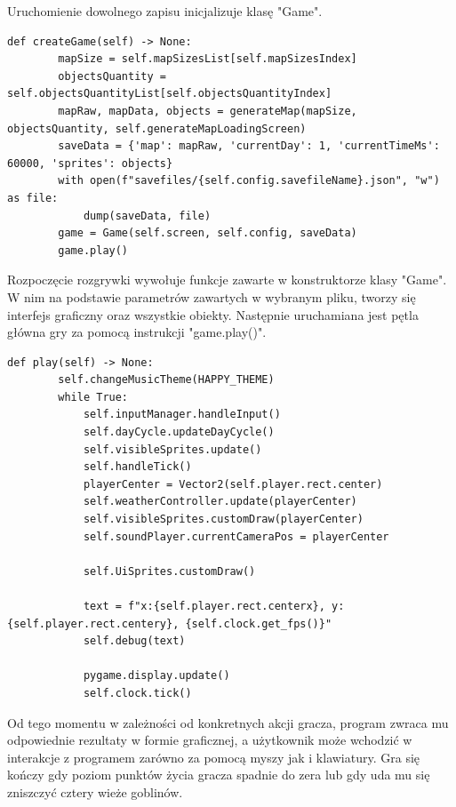 \documentclass{article}
\begin{document}
Uruchomienie dowolnego zapisu inicjalizuje klasę "Game".

\begin{center}
    \begin{lstlisting}[language=pythonSchema]
    def createGame(self) -> None:
        mapSize = self.mapSizesList[self.mapSizesIndex]
        objectsQuantity = self.objectsQuantityList[self.objectsQuantityIndex]
        mapRaw, mapData, objects = generateMap(mapSize, objectsQuantity, self.generateMapLoadingScreen)
        saveData = {'map': mapRaw, 'currentDay': 1, 'currentTimeMs': 60000, 'sprites': objects}
        with open(f"savefiles/{self.config.savefileName}.json", "w") as file:
            dump(saveData, file)
        game = Game(self.screen, self.config, saveData)
        game.play()
    \end{lstlisting}
\end{center}

Rozpoczęcie rozgrywki wywołuje funkcje zawarte w konstruktorze klasy "Game". W nim na podstawie parametrów zawartych w wybranym pliku, tworzy się interfejs graficzny oraz wszystkie obiekty. Następnie uruchamiana jest pętla główna gry za pomocą instrukcji "game.play()".

\newpage

\begin{center}
    \begin{lstlisting}[language=pythonSchema]
    def play(self) -> None:
        self.changeMusicTheme(HAPPY_THEME)
        while True:
            self.inputManager.handleInput()
            self.dayCycle.updateDayCycle()
            self.visibleSprites.update()
            self.handleTick()
            playerCenter = Vector2(self.player.rect.center)
            self.weatherController.update(playerCenter)
            self.visibleSprites.customDraw(playerCenter)
            self.soundPlayer.currentCameraPos = playerCenter

            self.UiSprites.customDraw()

            text = f"x:{self.player.rect.centerx}, y:{self.player.rect.centery}, {self.clock.get_fps()}"
            self.debug(text)

            pygame.display.update()
            self.clock.tick()
    \end{lstlisting}
\end{center}

Od tego momentu w zależności od konkretnych akcji gracza, program zwraca mu odpowiednie rezultaty w formie graficznej, a użytkownik może wchodzić w interakcje z programem zarówno za pomocą myszy jak i klawiatury. Gra się kończy gdy poziom punktów życia gracza spadnie do zera lub gdy uda mu się zniszczyć cztery wieże goblinów. 
\end{document}
